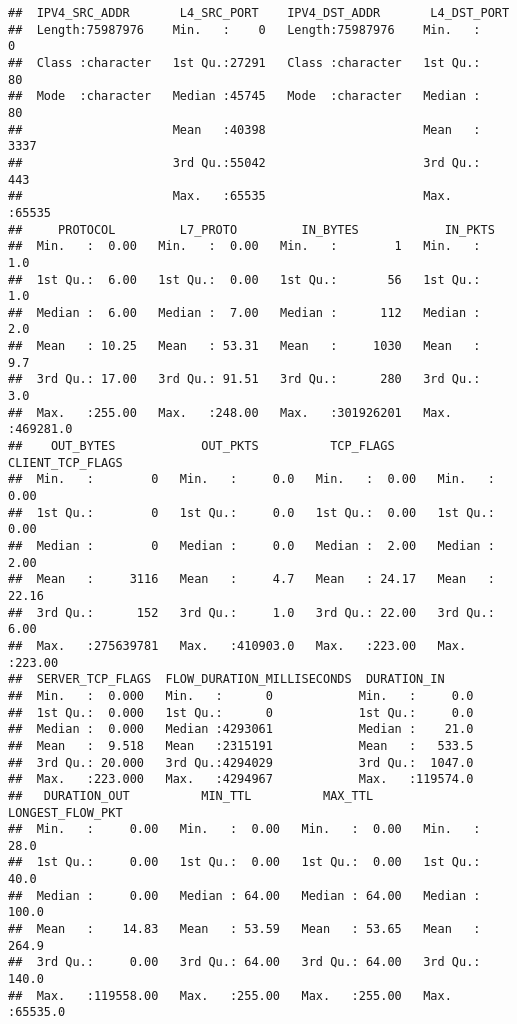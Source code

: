 \documentclass[
]{article}
\begin{document}
\begin{verbatim}
##  IPV4_SRC_ADDR       L4_SRC_PORT    IPV4_DST_ADDR       L4_DST_PORT   
##  Length:75987976    Min.   :    0   Length:75987976    Min.   :    0  
##  Class :character   1st Qu.:27291   Class :character   1st Qu.:   80  
##  Mode  :character   Median :45745   Mode  :character   Median :   80  
##                     Mean   :40398                      Mean   : 3337  
##                     3rd Qu.:55042                      3rd Qu.:  443  
##                     Max.   :65535                      Max.   :65535  
##     PROTOCOL         L7_PROTO         IN_BYTES            IN_PKTS        
##  Min.   :  0.00   Min.   :  0.00   Min.   :        1   Min.   :     1.0  
##  1st Qu.:  6.00   1st Qu.:  0.00   1st Qu.:       56   1st Qu.:     1.0  
##  Median :  6.00   Median :  7.00   Median :      112   Median :     2.0  
##  Mean   : 10.25   Mean   : 53.31   Mean   :     1030   Mean   :     9.7  
##  3rd Qu.: 17.00   3rd Qu.: 91.51   3rd Qu.:      280   3rd Qu.:     3.0  
##  Max.   :255.00   Max.   :248.00   Max.   :301926201   Max.   :469281.0  
##    OUT_BYTES            OUT_PKTS          TCP_FLAGS      CLIENT_TCP_FLAGS
##  Min.   :        0   Min.   :     0.0   Min.   :  0.00   Min.   :  0.00  
##  1st Qu.:        0   1st Qu.:     0.0   1st Qu.:  0.00   1st Qu.:  0.00  
##  Median :        0   Median :     0.0   Median :  2.00   Median :  2.00  
##  Mean   :     3116   Mean   :     4.7   Mean   : 24.17   Mean   : 22.16  
##  3rd Qu.:      152   3rd Qu.:     1.0   3rd Qu.: 22.00   3rd Qu.:  6.00  
##  Max.   :275639781   Max.   :410903.0   Max.   :223.00   Max.   :223.00  
##  SERVER_TCP_FLAGS  FLOW_DURATION_MILLISECONDS  DURATION_IN      
##  Min.   :  0.000   Min.   :      0            Min.   :     0.0  
##  1st Qu.:  0.000   1st Qu.:      0            1st Qu.:     0.0  
##  Median :  0.000   Median :4293061            Median :    21.0  
##  Mean   :  9.518   Mean   :2315191            Mean   :   533.5  
##  3rd Qu.: 20.000   3rd Qu.:4294029            3rd Qu.:  1047.0  
##  Max.   :223.000   Max.   :4294967            Max.   :119574.0  
##   DURATION_OUT          MIN_TTL          MAX_TTL       LONGEST_FLOW_PKT 
##  Min.   :     0.00   Min.   :  0.00   Min.   :  0.00   Min.   :   28.0  
##  1st Qu.:     0.00   1st Qu.:  0.00   1st Qu.:  0.00   1st Qu.:   40.0  
##  Median :     0.00   Median : 64.00   Median : 64.00   Median :  100.0  
##  Mean   :    14.83   Mean   : 53.59   Mean   : 53.65   Mean   :  264.9  
##  3rd Qu.:     0.00   3rd Qu.: 64.00   3rd Qu.: 64.00   3rd Qu.:  140.0  
##  Max.   :119558.00   Max.   :255.00   Max.   :255.00   Max.   :65535.0  

\end{verbatim}
\end{document}
